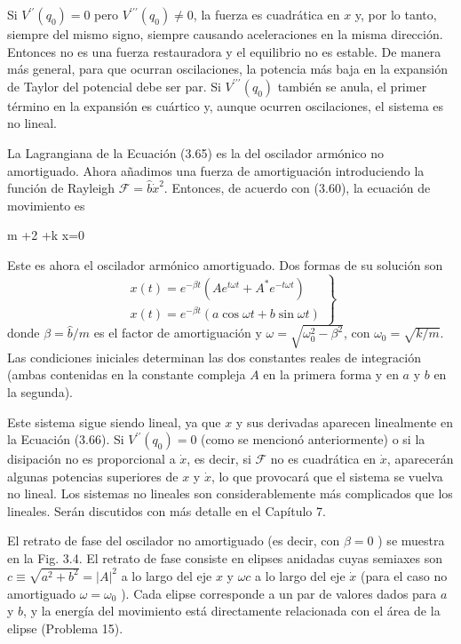 Si $V^{\prime \prime}\left(q_{0}\right)=0$ pero $V^{\prime \prime \prime}\left(q_{0}\right) \neq 0$, la fuerza es cuadrática en $x$ y, por lo tanto, siempre del mismo signo, siempre causando aceleraciones en la misma dirección. Entonces no es una fuerza restauradora y el equilibrio no es estable. De manera más general, para que ocurran oscilaciones, la potencia más baja en la expansión de Taylor del potencial debe ser par. Si $V^{\prime \prime \prime}\left(q_{0}\right)$ también se anula, el primer término en la expansión es cuártico y, aunque ocurren oscilaciones, el sistema es no lineal.

La Lagrangiana de la Ecuación (3.65) es la del oscilador armónico no amortiguado. Ahora añadimos una fuerza de amortiguación introduciendo la función de Rayleigh $\mathcal{F}=\hat{b} \dot{x}^{2}$. Entonces, de acuerdo con (3.60), la ecuación de movimiento es
\begin{DispWithArrows}[displaystyle, format=c]
m +2  +k x=0 
\end{DispWithArrows}

Este es ahora el oscilador armónico amortiguado. Dos formas de su solución son
$$
\left.\begin{array}{l}
x(t)=e^{-\beta t}\left(A e^{t \omega t}+A^{*} e^{-t \omega t}\right)  \tag{3.67}\\
x(t)=e^{-\beta t}(a \cos \omega t+b \sin \omega t)
\end{array}\right\}
$$
donde $\beta=\hat{b} / m$ es el factor de amortiguación y $\omega=\sqrt{\omega_{0}^{2}-\beta^{2}}$, con $\omega_{0}=\sqrt{k / m}$. Las condiciones iniciales determinan las dos constantes reales de integración (ambas contenidas en la constante compleja $A$ en la primera forma y en $a$ y $b$ en la segunda).

Este sistema sigue siendo lineal, ya que $x$ y sus derivadas aparecen linealmente en la Ecuación (3.66). Si $V^{\prime \prime}\left(q_{0}\right)=0$ (como se mencionó anteriormente) o si la disipación no es proporcional a $\dot{x}$, es decir, si $\mathcal{F}$ no es cuadrática en $\dot{x}$, aparecerán algunas potencias superiores de $x$ y $\dot{x}$, lo que provocará que el sistema se vuelva no lineal. Los sistemas no lineales son considerablemente más complicados que los lineales. Serán discutidos con más detalle en el Capítulo 7.

El retrato de fase del oscilador no amortiguado (es decir, con $\beta=0$ ) se muestra en la Fig. 3.4. El retrato de fase consiste en elipses anidadas cuyas semiaxes son $c \equiv \sqrt{a^{2}+b^{2}}=|A|^{2}$ a lo largo del eje $x$ y $\omega c$ a lo largo del eje $\dot{x}$ (para el caso no amortiguado $\omega=\omega_{0}$ ). Cada elipse corresponde a un par de valores dados para $a$ y $b$, y la energía del movimiento está directamente relacionada con el área de la elipse (Problema 15).

